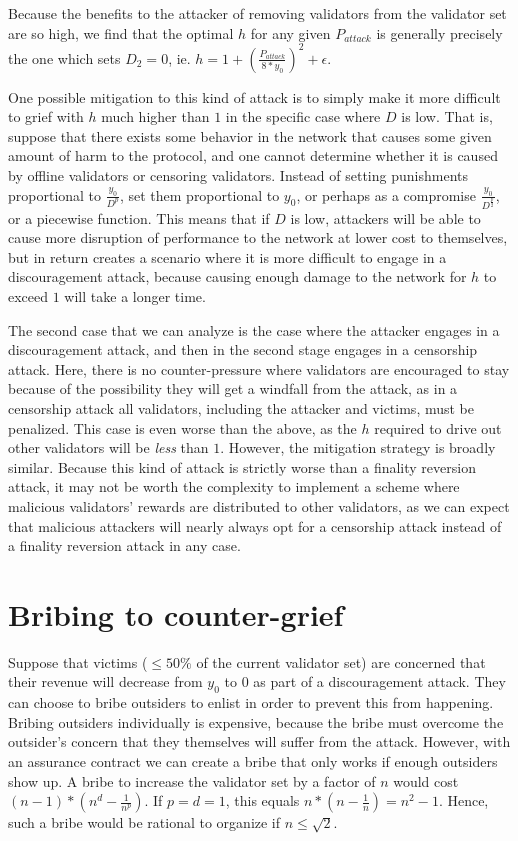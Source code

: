 \documentclass[12pt]{article}
\begin{document}
Because the benefits to the attacker of removing validators from the validator set are so high, we find that the optimal $h$ for any given $P_{attack}$ is generally precisely the one which sets $D_2 = 0$, ie. $h = 1 + (\frac{P_{attack}}{8 * y_0})^2 + \epsilon$.

One possible mitigation to this kind of attack is to simply make it more difficult to grief with $h$ much higher than $1$ in the specific case where $D$ is low. That is, suppose that there exists some behavior in the network that causes some given amount of harm to the protocol, and one cannot determine whether it is caused by offline validators or censoring validators. Instead of setting punishments proportional to $\frac{y_0}{D^p}$, set them proportional to $y_0$, or perhaps as a compromise $\frac{y_0}{D^\frac{p}{2}}$, or a piecewise function. This means that if $D$ is low, attackers will be able to cause more disruption of performance to the network at lower cost to themselves, but in return creates a scenario where it is more difficult to engage in a discouragement attack, because causing enough damage to the network for $h$ to exceed $1$ will take a longer time.

The second case that we can analyze is the case where the attacker engages in a discouragement attack, and then in the second stage engages in a censorship attack. Here, there is no counter-pressure where validators are encouraged to stay because of the possibility they will get a windfall from the attack, as in a censorship attack all validators, including the attacker and victims, must be penalized. This case is even worse than the above, as the $h$ required to drive out other validators will be \textit{less} than $1$. However, the mitigation strategy is broadly similar. Because this kind of attack is strictly worse than a finality reversion attack, it may not be worth the complexity to implement a scheme where malicious validators' rewards are distributed to other validators, as we can expect that malicious attackers will nearly always opt for a censorship attack instead of a finality reversion attack in any case.

\section{Bribing to counter-grief}

Suppose that victims ($\le 50\%$ of the current validator set) are concerned that their revenue will decrease from $y_0$ to 0 as part of a discouragement attack. They can choose to bribe outsiders to enlist in order to prevent this from happening. Bribing outsiders individually is expensive, because the bribe must overcome the outsider's concern that they themselves will suffer from the attack. However, with an assurance contract we can create a bribe that only works if enough outsiders show up. A bribe to increase the validator set by a factor of $n$ would cost $(n - 1) * (n^d - \frac{1}{n^p})$. If $p = d = 1$, this equals $n * (n - \frac{1}{n}) = n^2 - 1$. Hence, such a bribe would be rational to organize if $n \le \sqrt{2}$.
\end{document}
